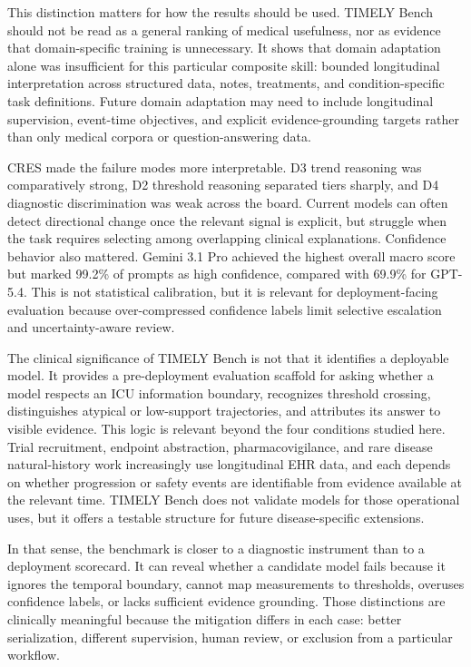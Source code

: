\documentclass[pdflatex,sn-nature]{sn-jnl}
\begin{document}
This distinction matters for how the results should be used. TIMELY Bench should not be read as a general ranking of medical usefulness, nor as evidence that domain-specific training is unnecessary. It shows that domain adaptation alone was insufficient for this particular composite skill: bounded longitudinal interpretation across structured data, notes, treatments, and condition-specific task definitions. Future domain adaptation may need to include longitudinal supervision, event-time objectives, and explicit evidence-grounding targets rather than only medical corpora or question-answering data.

CRES made the failure modes more interpretable. D3 trend reasoning was comparatively strong, D2 threshold reasoning separated tiers sharply, and D4 diagnostic discrimination was weak across the board. Current models can often detect directional change once the relevant signal is explicit, but struggle when the task requires selecting among overlapping clinical explanations. Confidence behavior also mattered. Gemini 3.1 Pro achieved the highest overall macro score but marked 99.2\% of prompts as high confidence, compared with 69.9\% for GPT-5.4. This is not statistical calibration, but it is relevant for deployment-facing evaluation because over-compressed confidence labels limit selective escalation and uncertainty-aware review.

The clinical significance of TIMELY Bench is not that it identifies a deployable model. It provides a pre-deployment evaluation scaffold for asking whether a model respects an ICU information boundary, recognizes threshold crossing, distinguishes atypical or low-support trajectories, and attributes its answer to visible evidence. This logic is relevant beyond the four conditions studied here. Trial recruitment, endpoint abstraction, pharmacovigilance, and rare disease natural-history work increasingly use longitudinal EHR data, and each depends on whether progression or safety events are identifiable from evidence available at the relevant time\cite{fda2023rwe,richesson2013ehrphenotyping,wang2009pharmacovigilance,harpaz2012adverseevent,fda2019rarediseasehistory,bastarache2018phers}. TIMELY Bench does not validate models for those operational uses, but it offers a testable structure for future disease-specific extensions.

In that sense, the benchmark is closer to a diagnostic instrument than to a deployment scorecard. It can reveal whether a candidate model fails because it ignores the temporal boundary, cannot map measurements to thresholds, overuses confidence labels, or lacks sufficient evidence grounding. Those distinctions are clinically meaningful because the mitigation differs in each case: better serialization, different supervision, human review, or exclusion from a particular workflow.
\end{document}
